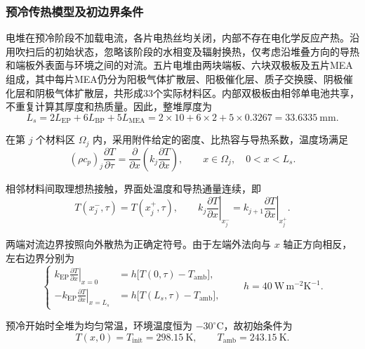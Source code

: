 \documentclass[bwprint]{gmcmthesis}
\numberwithin{figure}{section}
\begin{document}
\subsubsection{预冷传热模型及初边界条件}

电堆在预冷阶段不加载电流，各片电热丝均关闭，内部不存在电化学反应产热。沿用吹扫后的初始状态，忽略该阶段的水相变及辐射换热，仅考虑沿堆叠方向的导热和端板外表面与环境之间的对流。五片电堆由两块端板、六块双极板及五片MEA组成，其中每片MEA仍分为阳极气体扩散层、阳极催化层、质子交换膜、阴极催化层和阴极气体扩散层，共形成33个实际材料区。内部双极板由相邻单电池共享，不重复计算其厚度和热质量。因此，整堆厚度为
\begin{equation}
L_s=2L_{\mathrm{EP}}+6L_{\mathrm{BP}}+5L_{\mathrm{MEA}}
=2\times10+6\times2+5\times0.3267=33.6335\ \mathrm{mm}.
\tag{7-1}\label{eq:q4:stack_length}
\end{equation}

在第 $j$ 个材料区 $\Omega_j$ 内，采用附件给定的密度、比热容与导热系数，温度场满足
\begin{equation}
(\rho c_p)_j\frac{\partial T}{\partial\tau}
=\frac{\partial}{\partial x}\left(k_j\frac{\partial T}{\partial x}\right),
\qquad x\in\Omega_j,\quad 0<x<L_s.
\tag{7-2}\label{eq:q4:precool_pde}
\end{equation}

相邻材料间取理想热接触，界面处温度和导热通量连续，即
\begin{equation}
T(x_j^-,\tau)=T(x_j^+,\tau),\qquad
k_j\left.\frac{\partial T}{\partial x}\right|_{x_j^-}
=k_{j+1}\left.\frac{\partial T}{\partial x}\right|_{x_j^+}.
\tag{7-3}\label{eq:q4:precool_interface}
\end{equation}

两端对流边界按照向外散热为正确定符号。由于左端外法向与 $x$ 轴正方向相反，左右边界分别为
\begin{equation}
\left\{\begin{aligned}
k_{\mathrm{EP}}\left.\frac{\partial T}{\partial x}\right|_{x=0}
&=h\big[T(0,\tau)-T_{\mathrm{amb}}\big],\\
-k_{\mathrm{EP}}\left.\frac{\partial T}{\partial x}\right|_{x=L_s}
&=h\big[T(L_s,\tau)-T_{\mathrm{amb}}\big],
\end{aligned}\right.
\qquad h=40\ \mathrm{W\,m^{-2}K^{-1}}.
\tag{7-4}\label{eq:q4:precool_robin}
\end{equation}

预冷开始时全堆为均匀常温，环境温度恒为 $-30^\circ\mathrm C$，故初始条件为
\begin{equation}
T(x,0)=T_{\mathrm{init}}=298.15\ \mathrm K,\qquad
T_{\mathrm{amb}}=243.15\ \mathrm K.
\tag{7-5}\label{eq:q4:precool_initial}
\end{equation}
\end{document}
